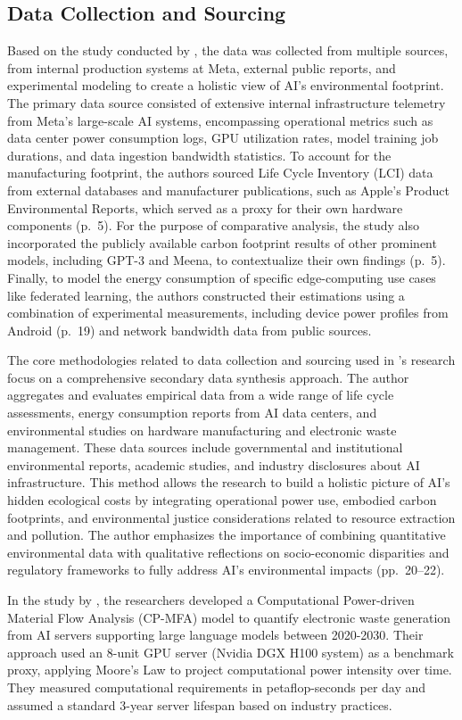 \documentclass[a4paper, 12pt]{article}
\begin{document}
\subsection{Data Collection and Sourcing}
Based on the study conducted by \citet{Wu2022}, the data was collected from multiple sources, from internal production systems at Meta, external public reports, and experimental modeling to create a holistic view of AI's environmental footprint. The primary data source consisted of extensive internal infrastructure telemetry from Meta's large-scale AI systems, encompassing operational metrics such as data center power consumption logs, GPU utilization rates, model training job durations, and data ingestion bandwidth statistics. To account for the manufacturing footprint, the authors sourced Life Cycle Inventory (LCI) data from external databases and manufacturer publications, such as Apple's Product Environmental Reports, which served as a proxy for their own hardware components (p.~5). For the purpose of comparative analysis, the study also incorporated the publicly available carbon footprint results of other prominent models, including GPT-3 and Meena, to contextualize their own findings (p.~5). Finally, to model the energy consumption of specific edge-computing use cases like federated learning, the authors constructed their estimations using a combination of experimental measurements, including device power profiles from Android (p.~19) and network bandwidth data from public sources.\hfill \break
\par The core methodologies related to data collection and sourcing used in \citet{Zhuk2023}'s research focus on a comprehensive secondary data synthesis approach. The author aggregates and evaluates empirical data from a wide range of life cycle assessments, energy consumption reports from AI data centers, and environmental studies on hardware manufacturing and electronic waste management. These data sources include governmental and institutional environmental reports, academic studies, and industry disclosures about AI infrastructure. This method allows the research to build a holistic picture of AI’s hidden ecological costs by integrating operational power use, embodied carbon footprints, and environmental justice considerations related to resource extraction and pollution. The author emphasizes the importance of combining quantitative environmental data with qualitative reflections on socio-economic disparities and regulatory frameworks to fully address AI’s environmental impacts (pp.~20--22). \hfill \break
\par In the study by \citet{wang_2024_ewaste}, the researchers developed a Computational Power-driven Material Flow Analysis (CP-MFA) model to quantify electronic waste generation from AI servers supporting large language models between 2020-2030. Their approach used an 8-unit GPU server (Nvidia DGX H100 system) as a benchmark proxy, applying Moore's Law to project computational power intensity over time. They measured computational requirements in petaflop-seconds per day and assumed a standard 3-year server lifespan based on industry practices. \hfill \break
\end{document}
